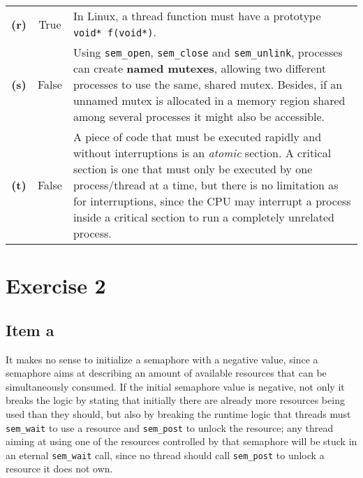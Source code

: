{\begin{center}
\begin{longtable}{c | c p{132mm}}
        \textbf{(r)} & True & In Linux, a thread function must have a prototype \texttt{void* f(void*)}. \\
        \textbf{(s)} & False & Using \texttt{sem\_open}, \texttt{sem\_close} and \texttt{sem\_unlink}, processes can create \textbf{named mutexes}, allowing two different processes to use the same, shared mutex. Besides, if an unnamed mutex is allocated in a memory region shared among several processes it might also be accessible. \\
        \textbf{(t)} & False & A piece of code that must be executed rapidly and without interruptions is an \emph{atomic} section. A critical section is one that must only be executed by one process/thread at a time, but there is no limitation as for interruptions, since the CPU may interrupt a process inside a critical section to run a completely unrelated process.
    \end{longtable}
\end{center}
\section{Exercise 2}

\subsection{Item a}
It makes no sense to initialize a semaphore with a negative value, since a semaphore aims at describing an amount of available resources that can be simultaneously consumed. If the initial semaphore value is negative, not only it breaks the logic by stating that initially there are already more resources being used than they should, but also by breaking the runtime logic that threads must \texttt{sem\_wait} to use a resource and \texttt{sem\_post} to unlock the resource; any thread aiming at using one of the resources controlled by that semaphore will be stuck in an eternal \texttt{sem\_wait} call, since no thread should call \texttt{sem\_post} to unlock a resource it does not own.

}

